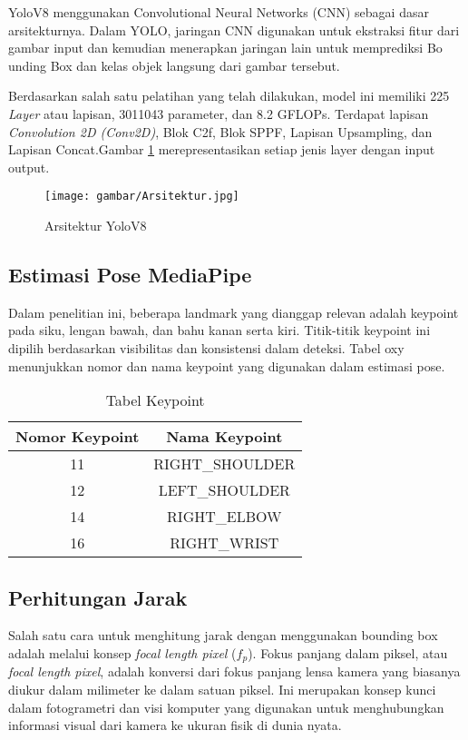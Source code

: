 \sloppy

YoloV8 menggunakan Convolutional Neural Networks (CNN) sebagai dasar arsitekturnya. Dalam YOLO, jaringan CNN digunakan untuk ekstraksi fitur dari gambar input dan kemudian menerapkan jaringan lain untuk memprediksi Bo unding Box dan kelas objek langsung dari gambar tersebut.

Berdasarkan salah satu pelatihan yang telah dilakukan, model ini memiliki 225 \emph{Layer} atau lapisan, 3011043 parameter, dan 8.2 GFLOPs. Terdapat lapisan \emph{Convolution 2D (Conv2D)}, Blok C2f, Blok SPPF, Lapisan Upsampling, dan Lapisan Concat.Gambar \ref{fig:Arsitektur YoloV8 IO} merepresentasikan setiap jenis layer dengan input output.


\begin{figure}[H]
  \centering
  \texttt{[image: gambar/Arsitektur.jpg]}
  \caption{Arsitektur YoloV8}
  \label{fig:Arsitektur YoloV8 IO}
\end{figure}

\subsection{Estimasi Pose MediaPipe}
Dalam penelitian ini, beberapa landmark yang dianggap relevan adalah keypoint pada siku, lengan bawah, dan bahu kanan serta kiri. Titik-titik keypoint ini dipilih berdasarkan visibilitas dan konsistensi dalam deteksi. Tabel oxy menunjukkan nomor dan nama keypoint yang digunakan dalam estimasi pose.

\begin{table}[ht]
  \centering
  \caption{Tabel Keypoint}
  \label{tb:Tabel Keypoint}
  \begin{tabular}{|c|c|}
    \hline
    \rowcolor[HTML]{C0C0C0}
    \textbf{Nomor Keypoint} & \textbf{Nama Keypoint} \\
    \hline
    11 & RIGHT\_SHOULDER \\
    12 & LEFT\_SHOULDER \\
    14 & RIGHT\_ELBOW \\
    16 & RIGHT\_WRIST \\
    \hline
  \end{tabular}
\end{table}


\subsection{Perhitungan Jarak}
Salah satu cara untuk menghitung jarak dengan menggunakan bounding box adalah melalui konsep \emph{focal length pixel} ($f_p$). Fokus panjang dalam piksel, atau \emph{focal length pixel}, adalah konversi dari fokus panjang lensa kamera yang biasanya diukur dalam milimeter ke dalam satuan piksel. Ini merupakan konsep kunci dalam fotogrametri dan visi komputer yang digunakan untuk menghubungkan informasi visual dari kamera ke ukuran fisik di dunia nyata.

